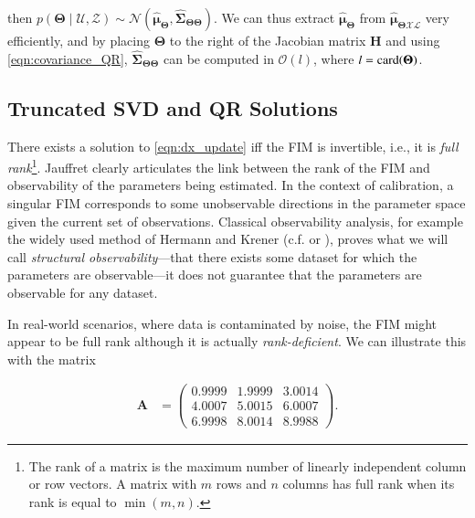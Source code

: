 \noindent then $p(\boldsymbol{\Theta}\mid\mathcal{U},\mathcal{Z})\sim\mathcal{N}
(\hat{\boldsymbol{\mu}}_{\boldsymbol{\Theta}},
\hat{\boldsymbol{\Sigma}}_{\boldsymbol{\Theta}\boldsymbol{\Theta}})$. We can
thus extract $\hat{\boldsymbol{\mu}}_{\boldsymbol{\Theta}}$ from
$\hat{\boldsymbol{\mu}}_{\boldsymbol{\Theta}\mathcal{X}\mathcal{L}}$ very
efficiently, and by placing $\boldsymbol{\Theta}$ to the right of the Jacobian
matrix $\mathbf{H}$ and using \eqref{eqn:covariance_QR},
$\hat{\boldsymbol{\Sigma}}_{\boldsymbol{\Theta}\boldsymbol{\Theta}}$ can be
computed in $\mathcal{O}(l)$, where $l=\operatorname{card}(\boldsymbol{\Theta})$.

\subsection{Truncated SVD and QR Solutions}\label{sec:tsvd}

There exists a solution to \eqref{eqn:dx_update} iff the FIM is
invertible, i.e., it is \emph{full rank}\footnote{The rank of a matrix is the
maximum number of linearly independent column or row vectors. A matrix
with $m$ rows and $n$ columns has full rank when its rank is equal to
$\min(m,n)$.}.
Jauffret \cite{jauffret07observability} clearly articulates the link
between the rank of the FIM and observability of the parameters being
estimated. In the context of calibration, a singular FIM corresponds
to some unobservable directions in the parameter space given the
current set of observations. Classical observability analysis, for
example the widely used method of Hermann and Krener
\cite{hermann77nonlinear} (c.f. \cite{kelly11visual} or
\cite{mirzaei08kalman}), proves what we will call {\em structural
observability}---that there exists
some dataset for which the parameters are observable---it does not
guarantee that the parameters are observable for any dataset.

In real-world scenarios, where data is contaminated by noise, the
FIM might appear to be full rank although it is actually
\emph{rank-deficient}. We can illustrate this with the matrix

\begin{equation}\label{eqn:rank_deficient_matrix}
  \begin{aligned}
    \mathbf{A} &=
    \begin{pmatrix}
    0.9999&1.9999&3.0014\\
    4.0007&5.0015&6.0007\\
    6.9998&8.0014&8.9988
    \end{pmatrix}.
  \end{aligned}
\end{equation}

